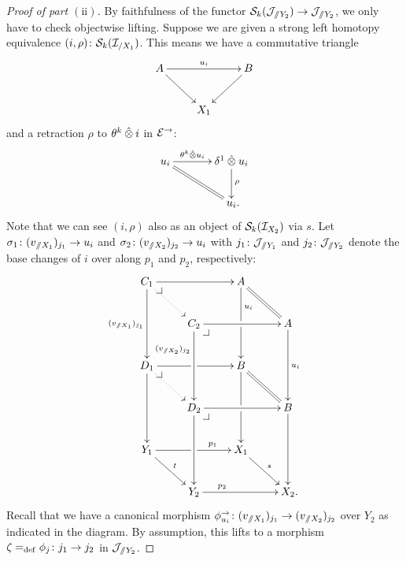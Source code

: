 \documentclass[reqno,10pt,a4paper,oneside,draft]{amsart}
\begin{document}
\begin{proof}[Proof of part $\mathrm{(ii)}$]
By faithfulness of the functor $\cal{S}_k(\cal{J}_{\fakeslice Y_2} )\to \cal{J}_{\fakeslice Y_2}$, we only have to check objectwise lifting.
Suppose we are given a strong left homotopy equivalence $(i, \rho) \co \cal{S}_k(\cal{I}_{/X_1})$.
This means we have a commutative triangle
\[
\xymatrix{
  A
  \ar[rr]^{u_i}
  \ar[dr]
&&
  B
  \ar[dl]
\\&
  X_1
}
\]
and a retraction $\rho$ to $\thetak \hatotimes i$ in $\catE^\to$:
\[
\xymatrix@C+1em{
  u_i
  \ar[r]^-{\thetak \hatotimes u_i}
  \ar@{=}[dr]
&
  \rcyl \hatotimes u_i \ar[d]^{\rho}
\\&
  u_i
\rlap{.}}
\]
Note that we can see $(i, \rho)$ also as an object of $\cal{S}_k(\cal{I}_{X_2})$ via $s$.
Let $\sigma_1 \co (v_{\fakeslice X_1})_{j_1} \to u_i$ and $\sigma_2 \co (v_{\fakeslice X_2})_{j_2} \to u_i$ with $j_1 \co \cal{J}_{\fakeslice Y_1}$ and $j_2 \co \cal{J}_{\fakeslice Y_2}$ denote the base changes of $i$ over along $p_1$ and $p_2$, respectively:
\[
\xymatrix{
  C_1
  \ar[rr]
  \ar[dd]_{(v_{\fakeslice X_1})_{j_1}}
  \pullback{dr}
  \ar@{.>}[dr]
&&
  A
  \ar[dd]^(0.3){u_i}|!{[dl];[dr]}{\hole}
  \ar@{=}[dr]
\\&
  C_2
  \ar[rr]
  \ar[dd]_(0.3){(v_{\fakeslice X_2})_{j_2}}
  \pullback{dr}
&&
  A
  \ar[dd]^{u_i}
\\
  D_1
  \ar[rr]|!{[dr];[ur]}{\hole}
  \ar[dd]
  \pullback{dr}
  \ar@{.>}[dr]
&&
  B
  \ar[dd]|!{[dl];[dr]}{\hole}
  \ar@{=}[dr]
\\&
  D_2
  \ar[rr]
  \ar[dd]
  \pullback{dr}
&&
  B
  \ar[dd]
\\
  Y_1
  \ar[rr]^(0.7){p_1}|!{[dr];[ur]}{\hole}
  \ar[dr]^{t}
&&
  X_1
  \ar[dr]^{s}
\\&
  Y_2
  \ar[rr]^(0.3){p_2}
&&
  X_2
\rlap{.}}
\]
Recall that we have a canonical morphism $\phi_{u_i}^\to \co (v_{\fakeslice X_1})_{j_1} \to (v_{\fakeslice X_2})_{j_2}$ over $Y_2$ as indicated in the diagram.
By assumption, this lifts to a morphism $\zeta \defeq \phi_j \co j_1 \to j_2$ in $\cal{J}_{\fakeslice Y_2}$.


\end{proof}
\end{document}
